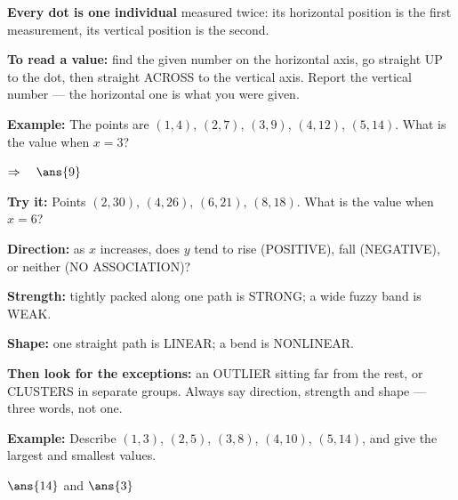\documentclass[12pt]{article}
\begin{document}


\begin{formulabox}
\textbf{Every dot is one individual} measured twice: its horizontal position is the first measurement, its vertical position is the second.\par
\textbf{To read a value:} find the given number on the horizontal axis, go straight UP to the dot, then straight ACROSS to the vertical axis. Report the vertical number --- the horizontal one is what you were given.
\end{formulabox}

\begin{examplebox}
\textbf{Example:} \quad The points are $(1, 4)$, $(2, 7)$, $(3, 9)$, $(4, 12)$, $(5, 14)$. What is the value when $x = 3$?

$\Rightarrow\quad \ans{9}$
\end{examplebox}

\begin{tryitbox}
\textbf{Try it:} \quad Points $(2, 30)$, $(4, 26)$, $(6, 21)$, $(8, 18)$. What is the value when $x = 6$?\\[2pt]
\end{tryitbox}


\begin{formulabox}
\textbf{Direction:} as $x$ increases, does $y$ tend to rise (POSITIVE), fall (NEGATIVE), or neither (NO ASSOCIATION)?\par
\textbf{Strength:} tightly packed along one path is STRONG; a wide fuzzy band is WEAK.\par
\textbf{Shape:} one straight path is LINEAR; a bend is NONLINEAR.\par
\textbf{Then look for the exceptions:} an OUTLIER sitting far from the rest, or CLUSTERS in separate groups. Always say direction, strength and shape --- three words, not one.
\end{formulabox}

\begin{examplebox}
\textbf{Example:} \quad Describe $(1, 3)$, $(2, 5)$, $(3, 8)$, $(4, 10)$, $(5, 14)$, and give the largest and smallest values.

$\ans{14}$ \quad and \quad $\ans{3}$
\end{examplebox}
\end{document}
